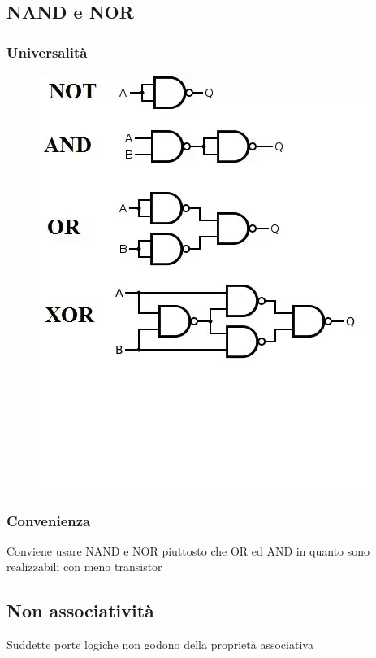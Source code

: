 \documentclass{report}
\begin{document}
    \subsection{NAND e NOR}
        \subsubsection{Universalità}
            \begin{center}
                \begin{figure}[H]
                    \includegraphics[width=\textwidth]{completeness.png}
                \end{figure}
            \end{center}  
        \subsubsection{Convenienza}
            Conviene usare NAND e NOR piuttosto che OR ed AND in quanto sono
            realizzabili con meno transistor
        \subsection{Non associatività}
            Suddette porte logiche non godono della proprietà associativa     
\end{document}
